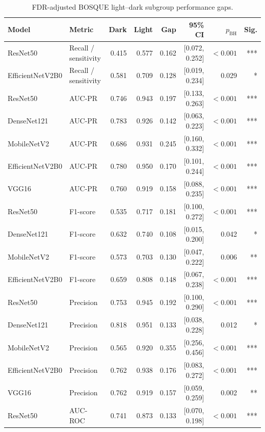 \begin{table}[h!]
\centering
\scriptsize
\caption{FDR-adjusted BOSQUE light--dark subgroup performance gaps.}
\label{tab:fdr-light-dark-gaps}
\setlength{\tabcolsep}{4pt}
\renewcommand{\arraystretch}{1.08}
\begin{tabular}{llrrrrrr}
\toprule
\textbf{Model} & \textbf{Metric} & \textbf{Dark} & \textbf{Light} & \textbf{Gap} & \textbf{95\% CI} & \textbf{$p_{\mathrm{BH}}$} & \textbf{Sig.} \\
\midrule
ResNet50 & Recall / sensitivity & 0.415 & 0.577 & 0.162 & [0.072, 0.252] & $<0.001$ & *** \\
EfficientNetV2B0 & Recall / sensitivity & 0.581 & 0.709 & 0.128 & [0.019, 0.234] & 0.029 & * \\
ResNet50 & AUC-PR & 0.746 & 0.943 & 0.197 & [0.133, 0.263] & $<0.001$ & *** \\
DenseNet121 & AUC-PR & 0.783 & 0.926 & 0.142 & [0.063, 0.223] & $<0.001$ & *** \\
MobileNetV2 & AUC-PR & 0.686 & 0.931 & 0.245 & [0.160, 0.332] & $<0.001$ & *** \\
EfficientNetV2B0 & AUC-PR & 0.780 & 0.950 & 0.170 & [0.101, 0.244] & $<0.001$ & *** \\
VGG16 & AUC-PR & 0.760 & 0.919 & 0.158 & [0.088, 0.235] & $<0.001$ & *** \\
ResNet50 & F1-score & 0.535 & 0.717 & 0.181 & [0.100, 0.272] & $<0.001$ & *** \\
DenseNet121 & F1-score & 0.632 & 0.740 & 0.108 & [0.015, 0.200] & 0.042 & * \\
MobileNetV2 & F1-score & 0.573 & 0.703 & 0.130 & [0.047, 0.222] & 0.006 & ** \\
EfficientNetV2B0 & F1-score & 0.659 & 0.808 & 0.148 & [0.067, 0.238] & $<0.001$ & *** \\
ResNet50 & Precision & 0.753 & 0.945 & 0.192 & [0.100, 0.290] & $<0.001$ & *** \\
DenseNet121 & Precision & 0.818 & 0.951 & 0.133 & [0.038, 0.228] & 0.012 & * \\
MobileNetV2 & Precision & 0.565 & 0.920 & 0.355 & [0.256, 0.456] & $<0.001$ & *** \\
EfficientNetV2B0 & Precision & 0.762 & 0.938 & 0.176 & [0.083, 0.272] & $<0.001$ & *** \\
VGG16 & Precision & 0.762 & 0.919 & 0.157 & [0.059, 0.259] & 0.002 & ** \\
ResNet50 & AUC-ROC & 0.741 & 0.873 & 0.133 & [0.070, 0.198] & $<0.001$ & *** \\

\end{tabular}
\end{table}
